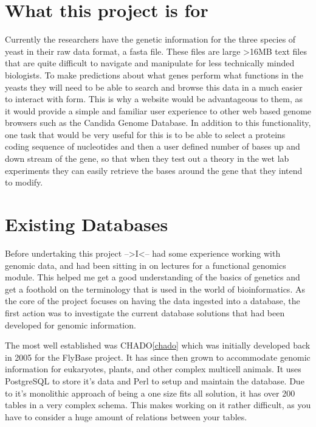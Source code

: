 \section{What this project is for}
Currently the researchers have the genetic information for the three species of yeast in their raw data format, a fasta file. These files are large >16MB text files that are quite difficult to navigate and manipulate for less technically minded biologists. To make predictions about what genes perform what functions in the yeasts they will need to be able to search and browse this data in a much easier to interact with form. This is why a website would be advantageous to them, as it would provide a simple and familiar user experience to other web based genome browsers such as the Candida Genome Database\cite{cgd}. In addition to this functionality, one task that would be very useful for this is to be able to select a proteins coding sequence of nucleotides and then a user defined number of bases up and down stream of the gene, so that when they test out a theory in the wet lab experiments they can easily retrieve the bases around the gene that they intend to modify. 

\section{Existing Databases}

Before undertaking this project -->I<-- had some experience working with genomic data, and had been sitting in on lectures for a functional genomics module. This helped me get a good understanding of the basics of genetics and get a foothold on the terminology that is used in the world of bioinformatics.  As the core of the project focuses on having the data ingested into a database, the first action was to investigate the current database solutions that had been developed for genomic information. 

The most well established was CHADO\ref{chado} which was initially developed back in 2005\cite{http://flybaselb1.uits.indiana.edu/reports/FBrf0206380.html} for the FlyBase\cite{flybase} project. It has since then grown to accommodate genomic information for eukaryotes, plants, and other complex multicell animals. It uses PostgreSQL\cite{postgres} to store it's data and Perl\cite{perl} to setup and maintain the database. Due to it's monolithic approach of being a one size fits all solution, it has over 200 tables in a very complex schema. This makes working on it rather difficult, as you have to consider a huge amount of relations between your tables. 

